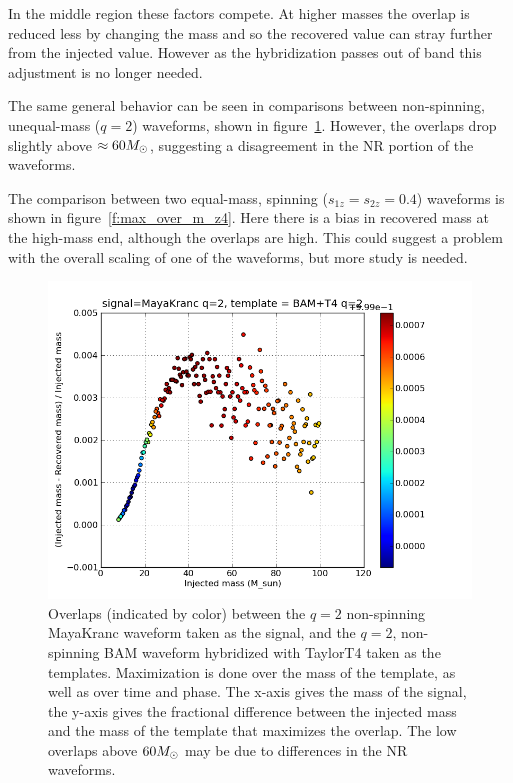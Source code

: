 In the middle region these factors compete.  At higher masses the
overlap is reduced less by changing the mass and so the recovered
value can stray further from the injected value.  However as the
hybridization passes out of band this adjustment is no longer needed.

The same general behavior can be seen in comparisons between 
non-spinning, unequal-mass ($q=2$) waveforms, shown in
figure~\ref{f:max_over_m_q2}.  However, the overlaps drop slightly 
above $\approx 60 M_\odot$, suggesting a disagreement in the NR portion
of the waveforms.

The comparison between two equal-mass, spinning ($s_{1z} = s_{2z} =
0.4$) waveforms is shown in figure~\ref{f:max_over_m_z4}.  Here there
is a bias in recovered mass at the high-mass end, although the
overlaps are high.  This could suggest a problem with the overall
scaling of one of the waveforms, but more study is needed.


\begin{figure}
  \includegraphics[width=\linewidth]{figures/ninja2/maya_bam_q2_max_over_m} 
  \caption[Overlaps between unequal-mass submissions maximized over mass]{
  \label{f:max_over_m_q2}
Overlaps (indicated by color) between the $q=2$ non-spinning MayaKranc
waveform taken as the signal, and the $q=2$, non-spinning BAM waveform
hybridized with TaylorT4 taken as the templates.  Maximization is done
over the mass of the template, as well as over time and phase.  The
x-axis gives the mass of the signal, the y-axis gives the fractional
difference between the injected mass and the mass of the template that
maximizes the overlap.  The low overlaps above $60 M_\odot$ may be due
to differences in the NR waveforms.}
\end{figure}%




